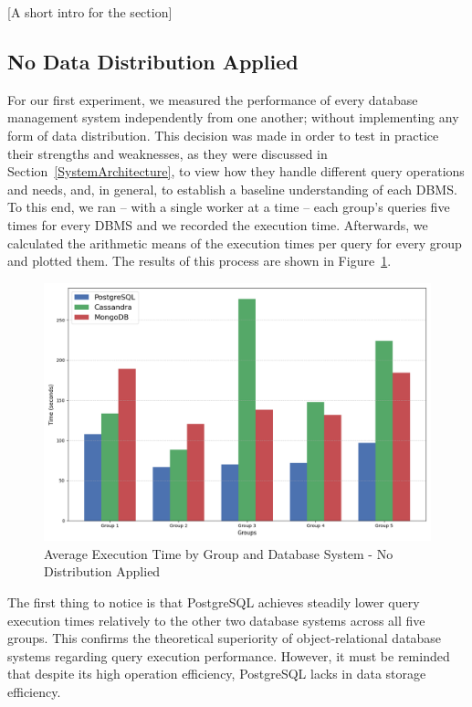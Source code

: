 \documentclass[conference]{IEEEtran}
\begin{document}
 [A short intro for the section]

\subsection{No Data Distribution Applied}\label{no_dist}

For our first experiment, we measured the performance of every database management system independently from one another; without implementing any form of data distribution. This decision was made in order to test in practice their strengths and weaknesses, as they were discussed in Section~\ref{SystemArchitecture}, to view how they handle different query operations and needs, and, in general, to establish a baseline understanding of each DBMS. To this end, we ran – with a single worker at a time – each group’s queries five times for every DBMS and we recorded the execution time. Afterwards, we calculated the arithmetic means of the execution times per query for every group and plotted them. The results of this process are shown in Figure~\ref{fig:no_dist_applied}.

\begin{figure}[htbp]
    \centering
    \includegraphics[width=\linewidth]{figures/no_dist_applied.png}
    \caption{Average Execution Time by Group and Database System - No Distribution Applied}
    \label{fig:no_dist_applied}
\end{figure}

The first thing to notice is that PostgreSQL achieves steadily lower query execution times relatively to the other two database systems across all five groups. This confirms the theoretical superiority of object-relational database systems regarding query execution performance. However, it must be reminded that despite its high operation efficiency, PostgreSQL lacks in data storage efficiency.
\end{document}
